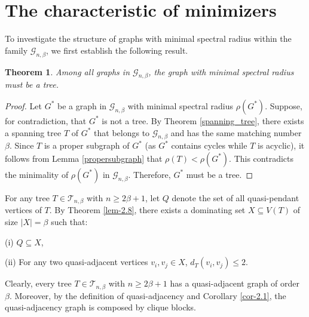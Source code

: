 \documentclass[12pt]{amsart}
\newtheorem{thm}{Theorem}[section]
\begin{document}




\section{The characteristic of minimizers}\label{sec-3}




To investigate the structure of graphs with minimal spectral radius within the family \(\mathcal{G}_{n,\beta}\), we first establish the following result.

\begin{thm}\label{thm-2.6}
Among all graphs in $\mathcal{G}_{n,\beta}$, the graph with minimal spectral radius must be a tree.
\end{thm}

\begin{proof}
Let $G^*$ be a graph in $\mathcal{G}_{n,\beta}$ with minimal spectral radius $\rho(G^*)$. Suppose, for contradiction, that $G^*$ is not a tree. 
By Theorem \ref{spanning_tree}, there exists a spanning tree $T$ of $G^*$ that belongs to $\mathcal{G}_{n,\beta}$ and has the same matching number $\beta$. Since $T$ is a proper subgraph of $G^*$ (as $G^*$ contains cycles while $T$ is acyclic), it follows from Lemma \ref{propersubgraph} that $\rho(T) < \rho(G^*)$. 
This contradicts the minimality of $\rho(G^*)$ in $\mathcal{G}_{n,\beta}$. Therefore, $G^*$ must be a tree.
\end{proof}




For any tree \(T \in \mathcal{T}_{n,\beta}\) with \(n \geq 2\beta + 1\), let \(Q\) denote the set of all quasi-pendant vertices of \(T\). By Theorem \ref{lem-2.8}, there exists a dominating set \(X \subseteq V(T)\) of size \(|X| = \beta\) such that:

(i) \(Q \subseteq X\),

(ii) For any two quasi-adjacent vertices \(v_i, v_j \in X\), \(d_T(v_i, v_j) \leq 2\).

Clearly, every tree \(T \in \mathcal{T}_{n,\beta}\) with \(n \geq 2\beta + 1\) has a quasi-adjacent graph of order $\beta$. 
Moreover, by the definition of quasi-adjacency and Corollary \ref{cor-2.1}, the quasi-adjacency graph is composed by clique blocks. 
\end{document}
